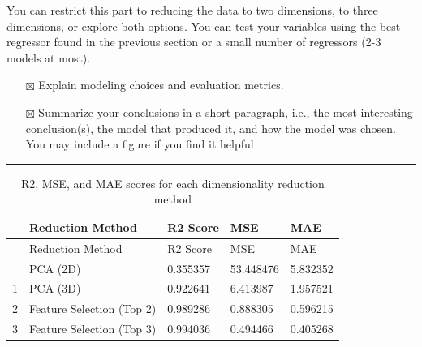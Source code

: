 \documentclass[
  letterpaper,
  DIV=11,
  numbers=noendperiod]{scrartcl}
\providecommand{\tightlist}{%
  \setlength{\itemsep}{0pt}\setlength{\parskip}{0pt}}\usepackage{longtable,booktabs,array}
\begin{document}
You can restrict this part to reducing the data to two dimensions, to
three dimensions, or explore both options. You can test your variables
using the best regressor found in the previous section or a small number
of regressors (2-3 models at most).

\begin{itemize}
\tightlist
\item[$\boxtimes$]
  Explain modeling choices and evaluation metrics.
\item[$\boxtimes$]
  Summarize your conclusions in a short paragraph, i.e., the most
  interesting conclusion(s), the model that produced it, and how the
  model was chosen. You may include a figure if you find it helpful
\end{itemize}

\begin{center}\rule{0.5\linewidth}{0.5pt}\end{center}

\label{best-dimensionality-reduction}
\begin{longtable}[]{@{}lllll@{}}
\caption{R2, MSE, and MAE scores for each dimensionality reduction
method}\tabularnewline
\toprule\noalign{}
& Reduction Method & R2 Score & MSE & MAE \\
\midrule\noalign{}
\endfirsthead
\toprule\noalign{}
& Reduction Method & R2 Score & MSE & MAE \\
\midrule\noalign{}
\endhead
\bottomrule\noalign{}
\endlastfoot
0 & PCA (2D) & 0.355357 & 53.448476 & 5.832352 \\
1 & PCA (3D) & 0.922641 & 6.413987 & 1.957521 \\
2 & Feature Selection (Top 2) & 0.989286 & 0.888305 & 0.596215 \\
3 & Feature Selection (Top 3) & 0.994036 & 0.494466 & 0.405268 \\
\end{longtable}
\end{document}
